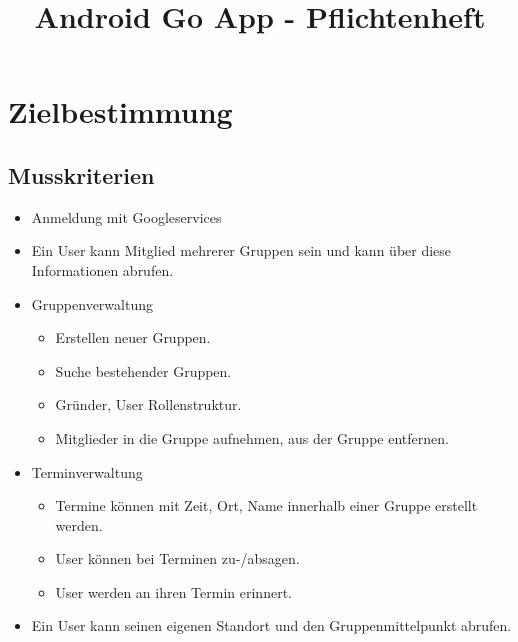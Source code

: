 \documentclass{scrartcl}
\title{Android Go App - Pflichtenheft}
\begin{document}
	\maketitle
	\newpage
	
	\tableofcontents
	\newpage
	
	\section{Zielbestimmung}
	\subsection{Musskriterien}
		\begin{itemize}
		\item Anmeldung mit Googleservices
		\item Ein User kann Mitglied mehrerer Gruppen sein und kann über diese Informationen abrufen.
		\item Gruppenverwaltung
			\begin{itemize}
			\item Erstellen neuer Gruppen.
			\item Suche bestehender Gruppen.
			\item Gründer, User Rollenstruktur.
			\item Mitglieder in die Gruppe aufnehmen, aus der Gruppe entfernen.
			\end{itemize}
		\item Terminverwaltung
			\begin{itemize}
			\item Termine können mit Zeit, Ort, Name innerhalb einer Gruppe erstellt werden.
			\item User können bei Terminen zu-/absagen.
			\item User werden an ihren Termin erinnert.
			\end{itemize}
		\item Ein User kann seinen eigenen Standort und den Gruppenmittelpunkt abrufen.	
		\end{itemize}
\end{document}
